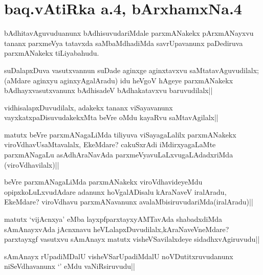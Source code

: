 \section*{baq.vAtiRka a.4, bArxhamxNa.4}


\begin{artha}
bAdhitavAguvuduanunx bAdhisuvudariMdale parxmANakekx pArxmANayxvu tananx parxmeVya tatavxda 
saMbaMdhadiMda savrUpavanunx paDediruva parxmANakekx tiLiyabahudu.
\end{artha}

\begin{artha}
suDalapxDuva vasutxvannun suDade aginxge aginxtavxvu saMtatavAguvudilalx;(aMdare aginxyu aginxyAgalAradu) idu heVgoV hAgeye parxmANakekx bAdhayxvasutxvanunx bAdhisadeV bAdhakatavxvu baruvudilalx||
\end{artha}


\begin{artha}
vidhisalapxDuvudilalx, adakekx tananx viSayavanunx vayxkatxpaDisuvudakekxMta beVre oMdu kayaRvu saMtavAgilalx||
\end{artha}

\begin{artha}
matutx beVre parxmANagaLiMda tiliyuva viSayagaLalilx parxmANakekx viroVdhavUsaMtavalalx, EkeMdare? cakuSxrAdi iMdirxyagaLaMte parxmANagaLu asAdhAraNavAda parxmeVyavuLaLxvugaLAdadxriMda (viroVdhavilalx)||
\end{artha}

\begin{artha}
beVre parxmANagaLiMda parxmANakekx viroVdhavideyeMdu opipxkoLuLxvudAdare adanunx hoVgalADisalu kAraNaveV iralAradu, EkeMdare? viroVdhavu parxmANavanunx avalaMbisiruvudariMda(iralAradu)||
\end{artha}


\begin{artha}
matutx `vijAcnxya' eMba layxpfparxtayxyAMTavAda shabadxdiMda sAmAnayxvAda jAcnxnavu heVLalapxDuvudilalx,kAraNaveVneMdare? parxtayxgf vasutxvu sAmAnayx matutx visheVSavilalxdeye sidadhxvAgiruvudu||
\end{artha}


\begin{artha}
sAmAnayx rUpadiMDalU visheVSarUpadiMdalU noVDutitxruvudanunx niSeVdhavanunx `\stext' eMdu vaNiRsiruvudu||
\end{artha}

